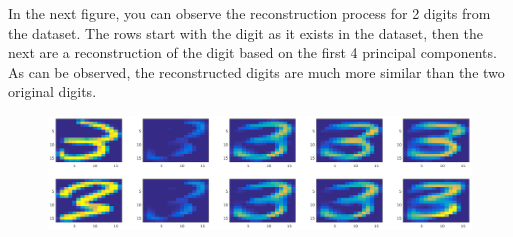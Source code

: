 \documentclass[11pt, a4paper]{article}
\begin{document}
In the next figure, you can observe the reconstruction process for 2
digits from the dataset. The rows start with the digit as it exists in
the dataset, then the next are a reconstruction of the digit based on
the first 4 principal components. As can be observed, the
reconstructed digits are much more similar than the two original
digits.

\begin{figure}[H]
    \centering
    \includegraphics[scale=.20]{unsupervised_reconstructions.png}
    \label{fig:reconstructions}
\end{figure}
\end{document}
